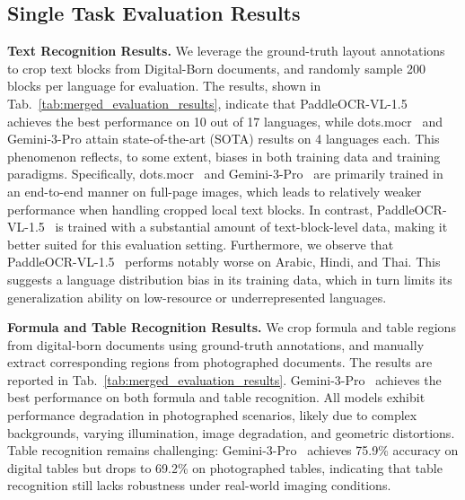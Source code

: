 \documentclass[runningheads]{llncs}
\begin{document}
\subsection{Single Task Evaluation Results}

\textbf{Text Recognition Results.} We leverage the ground-truth layout annotations to crop text blocks from Digital-Born documents, and randomly sample 200 blocks per language for evaluation. The results, shown in Tab.~\ref{tab:merged_evaluation_results}, indicate that PaddleOCR-VL-1.5~\cite{paddleocr-vl-1.5} achieves the best performance on 10 out of 17 languages, while dots.mocr~\cite{dotsmocr} and Gemini-3-Pro attain state-of-the-art (SOTA) results on 4 languages each. This phenomenon reflects, to some extent, biases in both training data and training paradigms. Specifically, dots.mocr~\cite{dotsmocr} and Gemini-3-Pro~\cite{gemini3pro} are primarily trained in an end-to-end manner on full-page images, which leads to relatively weaker performance when handling cropped local text blocks. In contrast, PaddleOCR-VL-1.5~\cite{paddleocr-vl-1.5} is trained with a substantial amount of text-block-level data, making it better suited for this evaluation setting. Furthermore, we observe that PaddleOCR-VL-1.5~\cite{paddleocr-vl-1.5} performs notably worse on Arabic, Hindi, and Thai. This suggests a language distribution bias in its training data, which in turn limits its generalization ability on low-resource or underrepresented languages.


\noindent
\textbf{Formula and Table Recognition Results.} 
We crop formula and table regions from digital-born documents using ground-truth annotations, and manually extract corresponding regions from photographed documents. The results are reported in Tab.~\ref{tab:merged_evaluation_results}. Gemini-3-Pro~\cite{gemini3pro} achieves the best performance on both formula and table recognition. All models exhibit performance degradation in photographed scenarios, likely due to complex backgrounds, varying illumination, image degradation, and geometric distortions. Table recognition remains challenging: Gemini-3-Pro~\cite{gemini3pro} achieves 75.9\% accuracy on digital tables but drops to 69.2\% on photographed tables, indicating that table recognition still lacks robustness under real-world imaging conditions.
\end{document}
